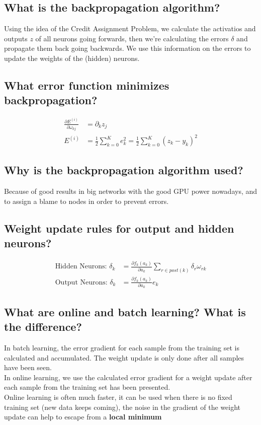 \documentclass[12pt]{scrartcl}
\begin{document}
\subsection{What is the backpropagation algorithm?}
Using the idea of the Credit Assignment Problem, we calculate the activatios and outputs $z$ of all neurons going forwards, then we're calculating the errors $\delta$ and propagate them back going backwards. We use this information on the errors to update the weights of the (hidden) neurons.

\subsection{What error function minimizes backpropagation?}
\begin{align*}
\frac{\partial E^{(i)}}{\partial\omega_{kj}} &= \partial_k z_j \\
E^{(i)} &= \frac{1}{2} \sum_{k=0}^K e^2_k = \frac{1}{2} \sum_{k=0}^K (z_k - y_k)^2
\end{align*}

\subsection{Why is the backpropagation algorithm used?}
Because of good results in big networks with the good GPU power nowadays, and to assign a blame to nodes in order to prevent errors.

\subsection{Weight update rules for output and hidden neurons?}
\begin{align*}
\text{Hidden Neurons: } \delta_k &= \frac{\partial f_k(a_k)}{\partial a_k} \sum_{r\in post(k)} \delta_r \omega_{rk} \\
\text{Output Neurons: } \delta_k &= \frac{\partial f_k(a_k)}{\partial a_k} e_k
\end{align*}

\subsection{What are online and batch learning? What is the difference?}
In batch learning, the error gradient for each sample from the training set is calculated and accumulated. The weight update is only done after all samples have been seen. \\
In online learning, we use the calculated error gradient for a weight update after each sample from the training set has been presented. \\
Online learning is often much faster, it can be used when there is no fixed training set (new data keeps coming), the noise in the gradient of the weight update can help to escape from a {\bf local minimum}
\end{document}
